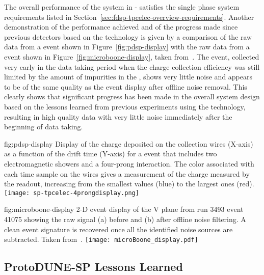 The overall performance of the  system in 
- satisfies the  
single phase   system requirements 
listed in Section~\ref{sec:fdsp-tpcelec-overview-requirements}. 
Another demonstration of the performance achieved
and of the progress made since previous detectors based on the
 technology is given by a comparison of the raw data from 
a  event shown in Figure~\ref{fig:pdsp-display} with
the raw data from a  event shown in
Figure~\ref{fig:microboone-display}, taken from~\cite{Acciarri:2017sde}.
The  event, collected very early in the data taking
period when the charge collection efficiency was still limited
by the amount of impurities in the , shows very little
noise and appears to be of the same quality as the 
event display after offline noise removal. This clearly shows
that significant progress has been made in the overall system
design based on the lessons learned from previous experiments
using the  technology, resulting in high quality
data with very little noise immediately after the beginning of
data taking.

\begin{dunefigure}
{fig:pdsp-display}
{Display of the charge deposited on the collection wires (X-axis) as
a function of the drift time (Y-axis) for a  event 
that includes two electromagnetic showers and a four-prong interaction.
The color associated with each time sample on the 
wires gives a measurement of the charge measured by the 
readout, increasing from the smallest values (blue) to the largest
ones (red).}
\texttt{[image: sp-tpcelec-4prongdisplay.png]}
\end{dunefigure}

\begin{dunefigure}
{fig:microboone-display}
{ 2-D event display of the V plane from run 3493 
event 41075 showing the raw signal (a) before and (b) after offline 
noise filtering. A clean event signature is recovered once all the 
identified noise sources are subtracted. Taken from~\cite{Acciarri:2017sde}.}
\texttt{[image: microBoone\_display.pdf]}
\end{dunefigure}

\subsection{ProtoDUNE-SP Lessons Learned}
\label{sec:fdsp-tpcelec-overview-lessons}

